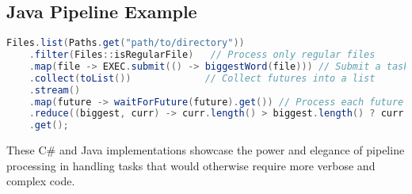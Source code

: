 \subsection*{Java Pipeline Example}
\begin{lstlisting}[language=Java, caption={Java Pipeline for Finding the Largest Word in Files}]
Files.list(Paths.get("path/to/directory"))
    .filter(Files::isRegularFile)   // Process only regular files
    .map(file -> EXEC.submit(() -> biggestWord(file))) // Submit a task for each file
    .collect(toList())             // Collect futures into a list
    .stream()
    .map(future -> waitForFuture(future).get()) // Process each future
    .reduce((biggest, curr) -> curr.length() > biggest.length() ? curr : biggest) // Reduce to find the largest word
    .get();
\end{lstlisting}

\lstset{basicstyle=\normalsize\ttfamily} %

These C\# and Java implementations showcase the power and elegance of pipeline processing in handling tasks that would otherwise require more verbose and complex code.
